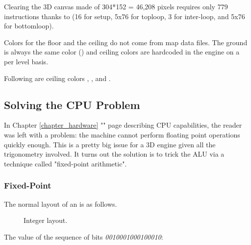 \begin{minipage}{\textwidth}
 
 \end{minipage}
\par
Clearing the 3D canvas made of 304*152 = 46,208 pixels requires only 779 instructions thanks to  (16 for setup, 5x76 for toploop, 3 for inter-loop, and 5x76 for bottomloop).\\
\par
Colors for the floor and the ceiling do not come from map data files. The ground is always the same color () and ceiling colors are hardcoded in the engine on a per level basis.\\
\par
\begin{minipage}{\textwidth}
 
 \end{minipage}
\par


Following are ceiling colors , ,  and .\\ 
\par
{}












\subsection{Solving the CPU Problem}

In Chapter \ref{chapter_hardware} "" page \pageref{chapter_hardware} describing CPU capabilities, the reader was left with a problem: the machine cannot perform floating point operations quickly enough. This is a pretty big issue for a 3D engine given all the trigonometry involved. It turns out the solution is to trick the ALU via a technique called "fixed-point arithmetic".







\subsubsection{Fixed-Point}
The normal layout of an  is as follows.
\begin{figure}[H]
\centering
 
 \caption{Integer layout.} \label{fig:int_layout}
 \end{figure}
The value of the sequence of bits \emph{0010001000100010}:
\begin{figure}[H]
\centering

 \end{figure}

